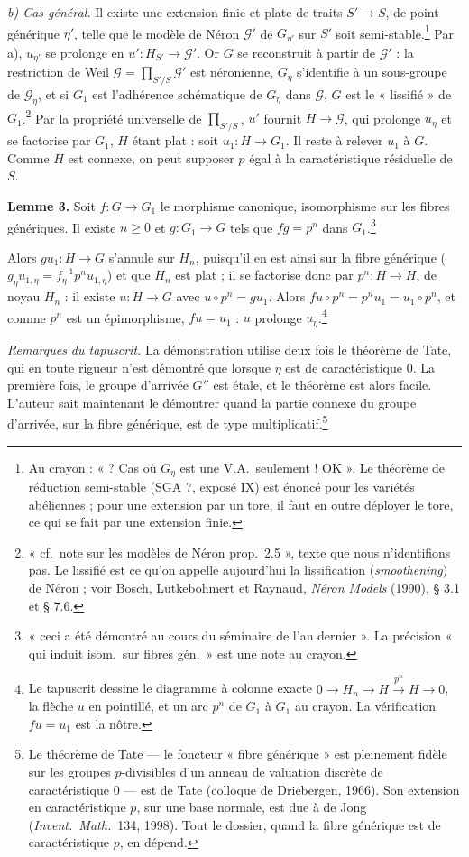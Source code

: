 \documentclass[11pt,a4paper]{article}
\begin{document}
\emph{b) Cas général.} Il existe une extension finie et plate de traits
$S' \to S$, de point générique $\eta'$, telle que le modèle de Néron
$\mathcal{G}'$ de $G_{\eta'}$ sur $S'$ soit semi-stable.\footnote{Au crayon :
« ? Cas où $G_\eta$ est une V.A.\ seulement ! OK ». Le théorème de réduction
semi-stable (SGA 7, exposé IX) est énoncé pour les variétés abéliennes ; pour
une extension par un tore, il faut en outre déployer le tore, ce qui se fait
par une extension finie.} Par a), $u_{\eta'}$ se prolonge en
$u' : H_{S'} \to \mathcal{G}'$. Or $G$ se reconstruit à partir de
$\mathcal{G}'$ : la restriction de Weil
$\mathcal{G} = \prod_{S'/S} \mathcal{G}'$ est néronienne, $G_\eta$ s'identifie
à un sous-groupe de $\mathcal{G}_\eta$, et si $G_1$ est l'adhérence
schématique de $G_\eta$ dans $\mathcal{G}$, $G$ est le « lissifié » de
$G_1$.\footnote{« cf.\ note sur les modèles de Néron prop.\ 2.5 », texte que
nous n'identifions pas. Le lissifié est ce qu'on appelle aujourd'hui la
lissification (\emph{smoothening}) de Néron ; voir Bosch, Lütkebohmert et
Raynaud, \emph{Néron Models} (1990), § 3.1 et § 7.6.} Par la propriété
universelle de $\prod_{S'/S}$, $u'$ fournit $H \to \mathcal{G}$, qui prolonge
$u_\eta$ et se factorise par $G_1$, $H$ étant plat : soit
$u_1 : H \to G_1$. Il reste à relever $u_1$ à $G$. Comme $H$ est connexe, on
peut supposer $p$ égal à la caractéristique résiduelle de $S$.

\textbf{Lemme 3.} Soit $f : G \to G_1$ le morphisme canonique, isomorphisme
sur les fibres génériques. Il existe $n \geq 0$ et $g : G_1 \to G$ tels que
$f g = p^n$ dans $G_1$.\footnote{« ceci a été démontré au cours du séminaire
de l'an dernier ». La précision « qui induit isom.\ sur fibres gén.\ » est
une note au crayon.}

Alors $g u_1 : H \to G$ s'annule sur $H_n$, puisqu'il en est ainsi sur la fibre
générique ($g_\eta u_{1,\eta} = f_\eta^{-1} p^n u_{1,\eta}$) et que $H_n$ est
plat ; il se factorise donc par $p^n : H \to H$, de noyau $H_n$ : il existe
$u : H \to G$ avec $u \circ p^n = g u_1$. Alors
$f u \circ p^n = p^n u_1 = u_1 \circ p^n$, et comme $p^n$ est un épimorphisme,
$f u = u_1$ : $u$ prolonge $u_\eta$.\footnote{Le tapuscrit dessine le
diagramme à colonne exacte $0 \to H_n \to H \xrightarrow{p^n} H \to 0$, la
flèche $u$ en pointillé, et un arc $p^n$ de $G_1$ à $G_1$ au crayon. La
vérification $f u = u_1$ est la nôtre.}

\emph{Remarques du tapuscrit.} La démonstration utilise deux fois le théorème
de Tate, qui en toute rigueur n'est démontré que lorsque $\eta$ est de
caractéristique $0$. La première fois, le groupe d'arrivée $G''$ est étale, et
le théorème est alors facile. L'auteur sait maintenant le démontrer quand la
partie connexe du groupe d'arrivée, sur la fibre générique, est de type
multiplicatif.\footnote{Le théorème de Tate --- le foncteur « fibre
générique » est pleinement fidèle sur les groupes $p$-divisibles d'un anneau
de valuation discrète de caractéristique $0$ --- est de Tate (colloque de
Driebergen, 1966). Son extension en caractéristique $p$, sur une base normale,
est due à de Jong (\emph{Invent.\ Math.}\ 134, 1998). Tout le dossier, quand la
fibre générique est de caractéristique $p$, en dépend.}
\end{document}
